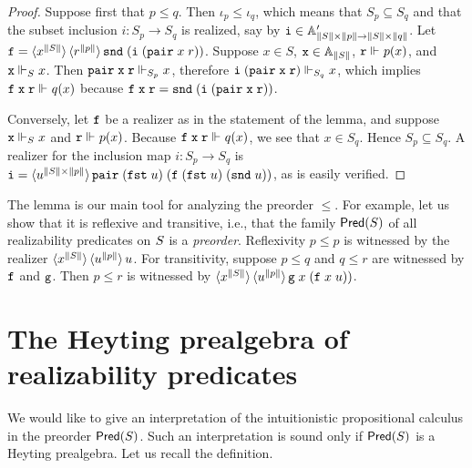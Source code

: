 \begin{proof}
  Suppose first that $p \leq q$. Then $\iota_p \leq \iota_q$, which
  means that $S_p \subseteq S_q$ and that the subset inclusion $i :
  S_p \to S_q$ is realized, say by $\R{i} \in \subAtyp{\T{S} \times \T{p}
    \to \T{S} \times \T{q}}$. Let $\R{f} = \tpcalam{x}{\T{S}}
    \tpcalam{r}{\T{p}}{\combSnd\;(\R{i}\;(\combPair\;x\;r))}$. Suppose $x
  \in S$, $\R{x} \in \Atyp{\T{S}}$, $\R{r} \rz p(x)$, and $\R{x} \rz[S]
  x$. Then $\combPair\;\R{x}\;\R{r} \rz[S_p] x$, therefore
  $\R{i}\;(\combPair\;\R{x}\;\R{r}) \rz[S_q] x$, which implies
  $\R{f}\;\R{x}\;\R{r} \rz q(x)$ because $\R{f}\;\R{x}\;\R{r} =
  \combSnd\;(\R{i}\;(\combPair\;\R{x}\;\R{r}))$.

  Conversely, let $\R{f}$ be a realizer as in the statement of the
  lemma, and suppose $\R{x} \rz[S] x$ and $\R{r} \rz p(x)$. Because
  $\R{f}\;\R{x}\;\R{r} \rz q(x)$, we see that $x \in S_q$. Hence $S_p
  \subseteq S_q$. A realizer for the inclusion map $i : S_p \to S_q$
  is $\R{i} = \tpcalam{u}{\T{S} \times
      \T{p}}{\combPair\;(\combFst\;u)\;(\R{f}\;(\combFst\;u)\;(\combSnd\;u))}$,
  as is easily verified.
\end{proof}

The lemma is our main tool for analyzing the preorder $\leq$. For
example, let us show that it is reflexive and transitive, i.e., that
the family $\Pred{\asm{S}}$ of all realizability predicates on
$\asm{S}$ is a \emph{preorder}. Reflexivity $p \leq p$ is witnessed by
the realizer $\tpcalam{x}{\T{S}} \tpcalam{u}{\T{p}}{u}$. For
transitivity, suppose $p \leq q$ and $q \leq r$ are witnessed by
$\R{f}$ and $\R{g}$. Then $p \leq r$ is witnessed by
$\tpcalam{x}{\T{S}} \tpcalam{u}{\T{p}}{\R{g}\;x\;(\R{f}\;x\;u))}$.


\section{The Heyting prealgebra of realizability predicates}
\label{sec:heyting-prealgebra}

We would like to give an interpretation of the intuitionistic
propositional calculus in the preorder $\Pred{\asm{S}}$. Such an
interpretation is sound only if $\Pred{\asm{S}}$ is a Heyting
prealgebra. Let us recall the definition.

